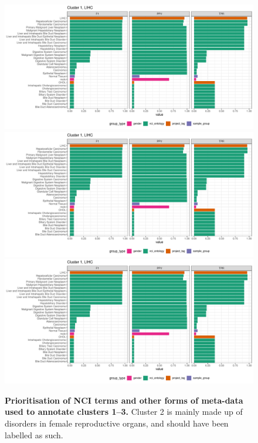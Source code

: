 \begin{figure}[H]
	\centering
	\includegraphics[width=.95\linewidth,page=1]{fig/tcga/cluster_labelling.pdf}
	\includegraphics[width=.95\linewidth,page=2]{fig/tcga/cluster_labelling.pdf}
	\includegraphics[width=.95\linewidth,page=3]{fig/tcga/cluster_labelling.pdf}
	\caption{
		\textbf{Prioritisation of NCI terms and other forms of meta-data used to annotate clusters 1--3.} Cluster 2 is mainly made up of disorders in female reproductive organs, and should have been labelled as such.
	}
	\label{fig:cluslab1}
\end{figure}

